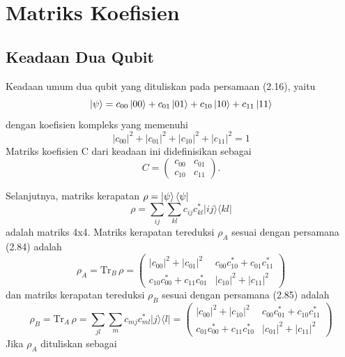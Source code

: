 \chapter{Matriks Koefisien}
\section{Keadaan Dua Qubit}
Keadaan umum dua qubit yang dituliskan pada persamaan (2.16), yaitu
\begin{equation*}
	\ket{\psi}=c_{00}\ket{00}+c_{01}\ket{01}+c_{10}\ket{10}+c_{11}\ket{11}
\end{equation*}
dengan koefisien kompleks yang memenuhi
\begin{equation*}
	|c_{00}|^2+|c_{01}|^2+|c_{10}|^2+|c_{11}|^2=1
\end{equation*}
Matriks koefisien C dari keadaan ini didefinisikan sebagai
\begin{equation}
	C=
	\begin{pmatrix}
		c_{00}&c_{01}\\
		c_{10}&c_{11}
	\end{pmatrix}.
\end{equation}
\par
Selanjutnya, matriks kerapatan $\rho=\ket{\psi}\bra{\psi}$
\begin{equation}
	\rho = \sum_{i j} \sum_{k l} c_{i j} c^{*}_{k l} | i j \rangle \langle k l |
\end{equation}
adalah matriks 4x4. Matriks kerapatan tereduksi $\rho_{A}$ sesuai dengan persamana (2.84) adalah
\begin{equation}
	\rho_A
	=\mathrm{Tr}_B\,\rho
	= \begin{pmatrix}
		|c_{00}|^2+|c_{01}|^2 & c_{00} c^{*}_{10}+c_{01} c^{*}_{11} \\
		c_{10} c^{*}_{00}+c_{11} c^{*}_{01} & |c_{10}|^2+|c_{11}|^2
	\end{pmatrix}
\end{equation}
dan matriks kerapatan tereduksi $\rho_{B}$ sesuai dengan persamana (2.85) adalah
\begin{equation}
	\rho_B
	=\mathrm{Tr}_A\,\rho
	= \sum_{j l} \sum_m c_{m j} c^{*}_{m l} | j \rangle \langle l |
	= \begin{pmatrix}
		|c_{00}|^2+|c_{10}|^2 & c_{00} c^{*}_{01}+c_{10} c^{*}_{11} \\
		c_{01} c^{*}_{00}+c_{11} c^{*}_{10} & |c_{01}|^2+|c_{11}|^2
	\end{pmatrix}
\end{equation}
Jika $\rho_{A}$ dituliskan sebagai
